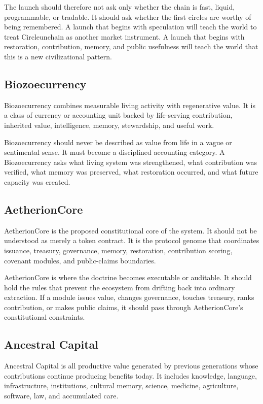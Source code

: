 \documentclass[12pt]{article}
\begin{document}
The launch should therefore not ask only whether the chain is fast, liquid, programmable, or tradable. It should ask whether the first circles are worthy of being remembered. A launch that begins with speculation will teach the world to treat Circleunchain as another market instrument. A launch that begins with restoration, contribution, memory, and public usefulness will teach the world that this is a new civilizational pattern.

\subsection{Biozoecurrency}

Biozoecurrency combines measurable living activity with regenerative value. It is a class of currency or accounting unit backed by life-serving contribution, inherited value, intelligence, memory, stewardship, and useful work.

Biozoecurrency should never be described as value from life in a vague or sentimental sense. It must become a disciplined accounting category. A Biozoecurrency asks what living system was strengthened, what contribution was verified, what memory was preserved, what restoration occurred, and what future capacity was created.

\subsection{AetherionCore}

AetherionCore is the proposed constitutional core of the system. It should not be understood as merely a token contract. It is the protocol genome that coordinates issuance, treasury, governance, memory, restoration, contribution scoring, covenant modules, and public-claims boundaries.

AetherionCore is where the doctrine becomes executable or auditable. It should hold the rules that prevent the ecosystem from drifting back into ordinary extraction. If a module issues value, changes governance, touches treasury, ranks contribution, or makes public claims, it should pass through AetherionCore's constitutional constraints.

\subsection{Ancestral Capital}

Ancestral Capital is all productive value generated by previous generations whose contributions continue producing benefits today. It includes knowledge, language, infrastructure, institutions, cultural memory, science, medicine, agriculture, software, law, and accumulated care.
\end{document}
